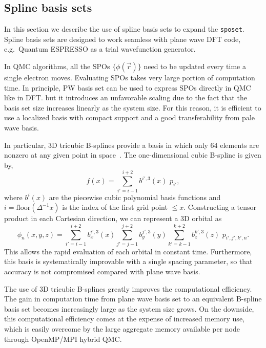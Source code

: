 \subsection{Spline basis sets}
In this section we describe the use of spline basis sets to expand the \texttt{sposet}.
Spline basis sets are designed to work seamless with plane wave DFT code, e.g.\ Quantum ESPRESSO as a trial wavefunction generator.

In QMC algorithms, all the SPOs $\{\phi(\vec{r})\}$ need to be updated every time a single electron moves.
Evaluating SPOs takes very large portion of computation time.
In principle, PW basis set can be used to express SPOs directly in QMC like in DFT.
but it introduces an unfavorable scaling due to the fact 
that the basis set size increases linearly as the system size.
For this reason, it is efficient to use a localized basis with compact
support and a good transferability from pale wave basis. 

In particular, 3D tricubic B-splines provide a basis in which only
64 elements are nonzero at any given point in space~\cite{blips4QMC}.
The one-dimensional cubic B-spline is given by,
\begin{equation}
f(x) = \sum_{i'=i-1}^{i+2} b^{i'\!,3}(x)\,\,  p_{i'},
\label{eq:SplineFunc}
\end{equation}
where $b^{i}(x)$ are the piecewise cubic polynomial basis functions
and $i = \text{floor}(\Delta^{-1} x)$ is the index of
the first grid point $\le x$.  Constructing a tensor product in each Cartesian
direction, we can represent a 3D orbital as
\begin{equation}
  \phi_n(x,y,z) = 
  \!\!\!\!\sum_{i'=i-1}^{i+2} \!\! b_x^{i'\!,3}(x) 
  \!\!\!\!\sum_{j'=j-1}^{j+2} \!\! b_y^{j'\!,3}(y) 
  \!\!\!\!\sum_{k'=k-1}^{k+2} \!\! b_z^{k'\!,3}(z) \,\, p_{i', j', k',n}.
\label{eq:TricubicValue}
\end{equation}
This allows the rapid evaluation of each orbital in constant time.
Furthermore, this basis is systematically improvable with a single spacing
parameter, so that accuracy is not compromised compared with plane wave basis.

The use of 3D tricubic B-splines greatly improves the computational efficiency.
The gain in computation time from plane wave basis set to an equivalent B-spline basis set 
becomes increasingly large as the system size grows.
On the downside, this computational efficiency comes at
the expense of increased memory use, which is easily overcome by the large
aggregate memory available per node through OpenMP/MPI hybrid QMC.

